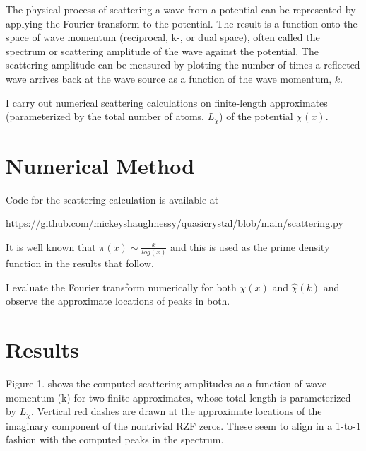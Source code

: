 \documentclass[11pt, oneside]{article}   	%
\begin{document}

The physical process of scattering a wave from a potential can be represented by applying the Fourier transform to the potential. The result is a function onto the space of wave momentum (reciprocal, k-, or dual space), often called the spectrum or scattering amplitude of the wave against the potential. The scattering amplitude can be measured by plotting the number of times a reflected wave arrives back at the wave source as a function of the wave momentum, $k$.

I carry out numerical scattering calculations on finite-length approximates (parameterized by the total number of atoms, $L_{\chi}$) of the potential $\chi(x)$.

\section{Numerical Method}

 Code for the scattering calculation is available at 
 
 https://github.com/mickeyshaughnessy/quasicrystal/blob/main/scattering.py
 
It is well known that $\pi(x) \sim \frac{x}{log(x)}$ and this is used as the prime density function in the results that follow.
 
I evaluate the Fourier transform numerically for both $\chi(x)$ and $\hat{\chi}(k)$ and observe the approximate locations of peaks in both.
 
 \section{Results}
 Figure 1. shows the computed scattering amplitudes as a function of wave momentum (k) for two finite approximates, whose total length is parameterized by $L_{\chi}$. Vertical red dashes are drawn at the approximate locations of the imaginary component of the nontrivial RZF zeros. These seem to align in a 1-to-1 fashion with the computed peaks in the spectrum.
 
\end{document}
